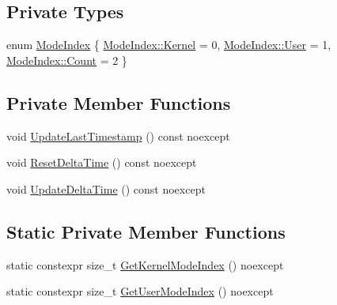 \subsection*{Private Types}
\begin{DoxyCompactItemize}
\item 
enum \hyperlink{classmage_1_1_c_p_u_timer_a98d59db3c396b14269c937e016c7625e}{Mode\+Index} \{ \hyperlink{classmage_1_1_c_p_u_timer_a98d59db3c396b14269c937e016c7625ea6ff9f4444ac481652f4412b5e1623846}{Mode\+Index\+::\+Kernel} = 0, 
\hyperlink{classmage_1_1_c_p_u_timer_a98d59db3c396b14269c937e016c7625ea8f9bfe9d1345237cb3b2b205864da075}{Mode\+Index\+::\+User} = 1, 
\hyperlink{classmage_1_1_c_p_u_timer_a98d59db3c396b14269c937e016c7625eae93f994f01c537c4e2f7d8528c3eb5e9}{Mode\+Index\+::\+Count} = 2
 \}
\end{DoxyCompactItemize}
\subsection*{Private Member Functions}
\begin{DoxyCompactItemize}
\item 
void \hyperlink{classmage_1_1_c_p_u_timer_aa956ede1a12c0c383e7fcc53e6f8c405}{Update\+Last\+Timestamp} () const noexcept
\item 
void \hyperlink{classmage_1_1_c_p_u_timer_acb1a264ae09cea3d96794e3c0af246e7}{Reset\+Delta\+Time} () const noexcept
\item 
void \hyperlink{classmage_1_1_c_p_u_timer_a4e82f7003a11e109495b7450e2f82f4f}{Update\+Delta\+Time} () const noexcept
\end{DoxyCompactItemize}
\subsection*{Static Private Member Functions}
\begin{DoxyCompactItemize}
\item 
static constexpr size\+\_\+t \hyperlink{classmage_1_1_c_p_u_timer_ae13da8e25167ec92802d272901e2598c}{Get\+Kernel\+Mode\+Index} () noexcept
\item 
static constexpr size\+\_\+t \hyperlink{classmage_1_1_c_p_u_timer_a457d65db3cb67775971e2750755ad403}{Get\+User\+Mode\+Index} () noexcept
\end{DoxyCompactItemize}
